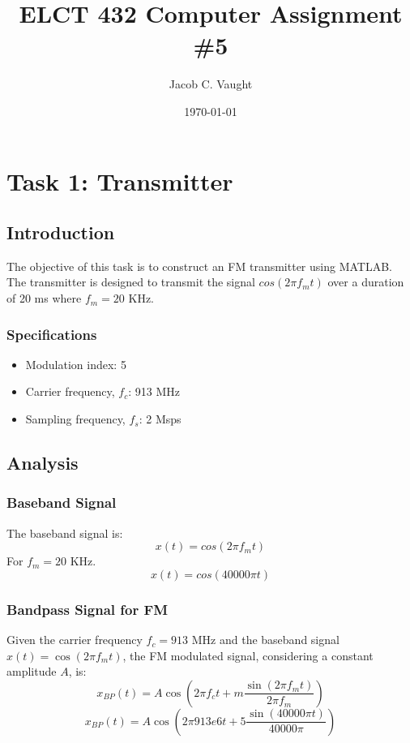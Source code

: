 \documentclass{article}
\begin{document}
\title{ELCT 432 Computer Assignment \#5}
\author{Jacob C. Vaught}
\date{\today}

\maketitle

\section*{Task 1: Transmitter}

\subsection*{Introduction}
The objective of this task is to construct an FM transmitter using MATLAB. The transmitter is designed to transmit the signal $cos(2\pi f_m t)$ over a duration of 20 ms where $f_m = 20$ KHz.

\subsubsection*{Specifications}
\begin{itemize}
    \item Modulation index: 5
    \item Carrier frequency, $f_c$: 913 MHz
    \item Sampling frequency, $f_s$: 2 Msps
\end{itemize}

\subsection*{Analysis}

\subsubsection*{Baseband Signal}
The baseband signal is:
\[ x(t) = cos(2\pi f_m t) \]
For $f_m = 20$ KHz.
\[ x(t) = cos(40000\pi t) \]

\subsubsection*{Bandpass Signal for FM}
Given the carrier frequency \( f_c = 913 \) MHz and the baseband signal \( x(t) = \cos(2\pi f_m t) \), the FM modulated signal, considering a constant amplitude \( A \), is:
\[ x_{BP}(t) = A \cos\left(2\pi f_c t + m \frac{\sin(2\pi f_m t)}{2\pi f_m}\right) \]
\[ x_{BP}(t) = A \cos\left(2\pi 913e6 t + 5 \frac{\sin(40000\pi t)}{40000\pi}\right) \]
\end{document}
